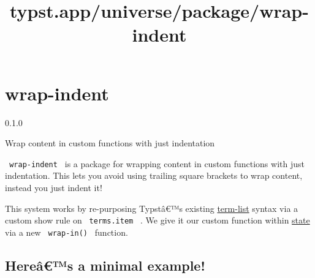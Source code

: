\title{typst.app/universe/package/wrap-indent}

\label{banner}
\section{wrap-indent}\label{wrap-indent}

{ 0.1.0 }

Wrap content in custom functions with just indentation

\label{readme}
\texttt{\ wrap-indent\ } is a package for wrapping content in custom
functions with just indentation. This lets you avoid using trailing
square brackets to wrap content, instead you just indent it!

This system works by re-purposing Typstâ€™s existing
\href{https://typst.app/docs/reference/model/terms/}{term-list} syntax
via a custom show rule on \texttt{\ terms.item\ } . We give it our
custom function within
\href{https://typst.app/docs/reference/introspection/state/}{state} via
a new \texttt{\ wrap-in()\ } function.

\subsection{Hereâ€™s a minimal
example!}\label{hereuxe2s-a-minimal-example}


\begin{Shaded}
\begin{Highlighting}[]









\NormalTok{)}



\end{Highlighting}
\end{Shaded}


